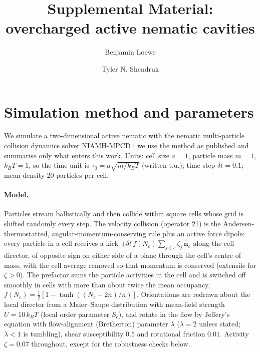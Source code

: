 \documentclass[aps,prl,onecolumn,superscriptaddress,amsmath,amssymb,nofootinbib]{revtex4-2}
\newcommand{\kT}{k_BT}
\begin{document}
\title{Supplemental Material: overcharged active nematic cavities}
\author{Benjamin Loewe}
\author{Tyler N. Shendruk}
\maketitle
\tableofcontents

\section{Simulation method and parameters}\label{si:methods}
We simulate a two-dimensional active nematic with the nematic multi-particle collision dynamics solver NIAMH-MPCD \cite{Shendruk2015,Kozhukhov2022,Kozhukhov2024};
we use the method as published and summarise only what enters this work. Units: cell size $a=1$, particle mass $m=1$, $\kT=1$, so the time unit is
$\tau_0=a\sqrt{m/\kT}$ (written t.u.); time step $\delta t=0.1$; mean density 20 particles per cell.

\paragraph{Model.} Particles stream ballistically and then collide within square cells whose grid is shifted randomly every step. The velocity collision
(operator 21) is the Andersen-thermostatted, angular-momentum-conserving rule plus an active force dipole: every particle in a cell receives a kick
$\pm\delta t\,f(N_c)\sum_{j\in c}\zeta_j\,\hat{\mathbf n}_c$ along the cell director, of opposite sign on either side of a plane through the cell's centre
of mass, with the cell average removed so that momentum is conserved (extensile for $\zeta>0$). The prefactor sums the particle activities in the cell and is
switched off smoothly in cells with more than about twice the mean occupancy, $f(N_c)=\tfrac12[1-\tanh((N_c-2\bar n)/\bar n)]$. Orientations are redrawn about
the local director from a Maier--Saupe distribution with mean-field strength $U=10\,\kT$ (local order parameter $S_c$), and rotate in the flow by Jeffery's equation
with flow-alignment (Bretherton) parameter $\lambda$ ($\lambda=2$ unless stated; $\lambda<1$ is tumbling), shear susceptibility $0.5$ and rotational friction $0.01$.
Activity $\zeta=0.07$ throughout, except for the robustness checks below.
\end{document}
